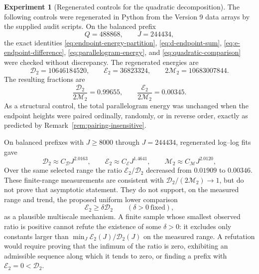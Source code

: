 \documentclass[11pt]{amsart}
\numberwithin{equation}{section}
\theoremstyle{plain}
\theoremstyle{definition}
\newtheorem{experiment}[theorem]{Experiment}
\theoremstyle{remark}
\begin{document}
\begin{experiment}[Regenerated controls for the quadratic decomposition]
\label{exp:v6-quadratic-controls}
The following controls were regenerated in Python from the Version 9 data
arrays by the supplied audit scripts.  On the
balanced prefix
\begin{equation}
\label{eq:v6-balanced-range}
Q=488868,
\qquad
J=244434,
\end{equation}
the exact identities
\eqref{eq:endpoint-energy-partition}, \eqref{eq:d-endpoint-sum},
\eqref{eq:e-endpoint-difference}, \eqref{eq:parallelogram-energy}, and
\eqref{eq:quadratic-comparison} were checked without discrepancy.  The regenerated
energies are
\begin{equation}
\label{eq:v6-energy-values}
\mathcal D_2=10646184520,
\qquad
\mathcal E_2=36823324,
\qquad
2\mathcal M_2=10683007844.
\end{equation}
The resulting fractions are
\begin{equation}
\label{eq:v6-energy-fractions}
\frac{\mathcal D_2}{2\mathcal M_2}=0.99655,
\qquad
\frac{\mathcal E_2}{2\mathcal M_2}=0.00345.
\end{equation}
As a structural control, the total parallelogram energy was unchanged when the
endpoint heights were paired ordinally, randomly, or in reverse order, exactly
as predicted by Remark~\ref{rem:pairing-insensitive}.

On balanced prefixes with $J\ge8000$ through $J=244434$, regenerated log--log
fits gave
\begin{equation}
\label{eq:v6-power-fits}
\mathcal D_2\approx C_{\mathcal D}J^{2.0163},
\qquad
\mathcal E_2\approx C_{\mathcal E}J^{1.4641},
\qquad
\mathcal M_2\approx C_{\mathcal M}J^{2.0120},
\end{equation}
Over the same selected range the ratio $\mathcal E_2/\mathcal D_2$ decreased
from $0.01909$ to $0.00346$.
These finite-range measurements are consistent with
$\mathcal D_2/(2\mathcal M_2)\to1$, but do not prove that asymptotic statement.
They do not support, on the measured range and trend, the proposed
uniform lower comparison
\begin{equation}
\label{eq:false-contraction}
\mathcal E_2\ge\delta\mathcal D_2
\qquad(\delta>0\ \text{fixed}),
\end{equation}
as a plausible multiscale mechanism.  A finite sample whose smallest observed
ratio is positive cannot refute the existence of some $\delta>0$: it excludes
only constants larger than $\min_J\mathcal E_2(J)/\mathcal D_2(J)$ on the
measured range.  A refutation would require proving that the infimum of the
ratio is zero, exhibiting an admissible sequence along which it tends to zero,
or finding a prefix with $\mathcal E_2=0<\mathcal D_2$.
\end{experiment}
\end{document}
